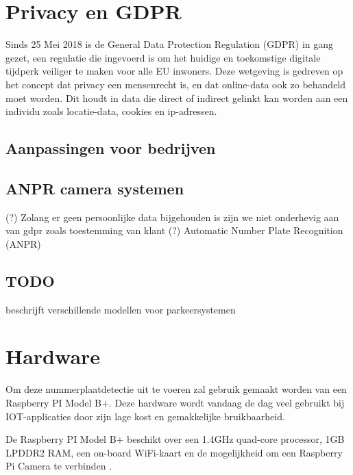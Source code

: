 \section{Privacy en GDPR}
\label{sec:privacy-en-gdpr}

Sinds 25 Mei 2018 is de General Data Protection Regulation (GDPR) in gang gezet, een regulatie die ingevoerd is om het huidige  en toekomstige digitale tijdperk veiliger te maken voor alle EU inwoners.
Deze wetgeving is gedreven op het concept dat privacy een mensenrecht is, en dat online-data ook zo behandeld moet worden. Dit houdt in data die direct of indirect gelinkt kan worden aan een individu zoals locatie-data, cookies en ip-adressen.\autocite{goddard2017eu}

\subsection{Aanpassingen voor bedrijven}

\subsection{ANPR camera systemen}
\label{anpr-cameras}

(?) Zolang er geen persoonlijke data bijgehouden is zijn we niet onderhevig aan van gdpr zoals toestemming van klant (?)
Automatic Number Plate Recognition (ANPR)

\subsection{TODO}
\textcite{sharma2017automated} beschrijft verschillende modellen voor parkeersystemen

\section{Hardware}
Om deze nummerplaatdetectie uit te voeren zal gebruik gemaakt worden van een Raspberry PI Model B+. Deze hardware wordt vandaag de dag veel gebruikt bij IOT-applicaties door zijn lage kost en gemakkelijke bruikbaarheid.  

De Raspberry PI Model B+ beschikt over een 1.4GHz quad-core processor, 1GB LPDDR2 RAM, een on-board WiFi-kaart en de mogelijkheid om een Raspberry Pi Camera te verbinden \autocite{raspberrypisitemodelbplus} .